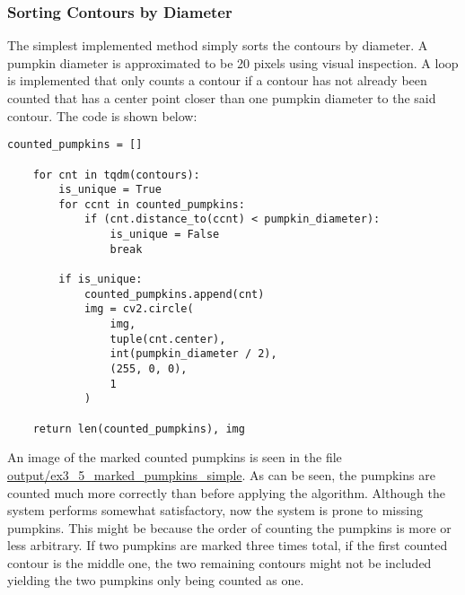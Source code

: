 \documentclass[../Head/Main.tex]{subfiles}
\begin{document}
\subsubsection{Sorting Contours by Diameter}\label{subsubsec:countFast}
The simplest implemented method simply sorts the contours by diameter. A pumpkin diameter is approximated to be 20 pixels using visual inspection. A loop is implemented that only counts a contour if a contour has not already been counted that has a center point closer than one pumpkin diameter to the said contour. The code is shown below:
\begin{verbatim}
counted_pumpkins = []

    for cnt in tqdm(contours):
        is_unique = True
        for ccnt in counted_pumpkins:
            if (cnt.distance_to(ccnt) < pumpkin_diameter):
                is_unique = False
                break

        if is_unique:
            counted_pumpkins.append(cnt)
            img = cv2.circle(
                img, 
                tuple(cnt.center), 
                int(pumpkin_diameter / 2), 
                (255, 0, 0), 
                1
            )

    return len(counted_pumpkins), img
\end{verbatim}
An image of the marked counted pumpkins is seen in the file \url{output/ex3_5_marked_pumpkins_simple}. As can be seen, the pumpkins are counted much more correctly than before applying the algorithm. Although the system performs somewhat satisfactory, now the system is prone to missing pumpkins. This might be because the order of counting the pumpkins is more or less arbitrary. If two pumpkins are marked three times total, if the first counted contour is the middle one, the two remaining contours might not be included yielding the two pumpkins only being counted as one. 
\end{document}
